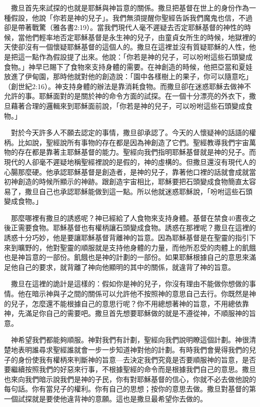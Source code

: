 \documentclass{book}
\begin{document}
　撒旦首先來試探的也就是耶穌與神旨意的關係。撒旦把基督在世上的身份作為一種假設，他說「你若是神的兒子」。我們無須提醒你聖經告訴我們魔鬼也信，不過卻是帶著戰驚（雅各書2:19）。當我們現代人毫不遲疑去否定耶穌基督的神性的時候，當他們輕率地否定耶穌基督是永生神的兒子，由童貞女所生的時候，地獄裡的天使卻沒有一個懷疑耶穌基督的這個人的。撒旦在這裡並沒有質疑耶穌的人性，他是把這一點作為假設提了出來。他說：「你若是神的兒子，可以吩咐這些石頭變成食物。」神早已賜下了食物來支持身體的需要。在神創造的時候，他把亞當和夏娃放進了伊甸園，那時他就對他的創造說：「園中各樣樹上的果子，你可以隨意吃」（創世紀2:16）。神支持身體的辦法是靠消耗食物。而撒旦卻在迷惑耶穌去做神不允許的事。耶穌面對的是關於神的命令方面的試探。在一個十分漂亮的外衣下，撒旦藉著合理的邏輯來到耶穌面前說，「你若是神的兒子，可以吩咐這些石頭變成食物。」

　對於今天許多人不願去認定的事情，撒旦卻承認了。今天的人懷疑神的話語的權柄。比如說，聖經說所有事物的存在都是因為神創造了它們。聖經教導我們宇宙萬物的存在都是靠著主耶穌基督的能力。聖經向我們指明耶穌基督就是神的兒子。而現代的人卻毫不遲疑地稱聖經裡說的是假的，神的虛構的。但撒旦還沒有現代人的心腸那麼硬。他承認耶穌基督是創造者，是神的兒子，靠著他口裡的話就會成就當初神創造的時候所顯示的神跡。跟創造宇宙相比，耶穌要把石頭變成食物簡直太容易了，撒旦自己也承認耶穌能做到這一點。所以他就迷惑耶穌說，「吩咐這些石頭變成食物。」

　那麼哪裡有撒旦的誘惑呢？神已經給了人食物來支持身體。基督在禁食40晝夜之後正需要食物。耶穌基督也有權柄讓石頭變成食物。誘惑在那裡呢？撒旦在這裡的誘惑十分巧妙，他是要讓耶穌基督背離神的旨意。因為耶穌基督是在聖靈的指引下來到曠野的，他對聖靈的順服就是支持他身體的力量，而他所忍受的肉體上的飢餓也是神旨意的一部份。飢餓也是神的計劃的一部份。如果耶穌根據自己的意思來滿足他自己的要求，就背離了神向他顯明的其中的關係，就違背了神的旨意。

　撒旦在這裡的詭計是這樣的：假如你是神的兒子，你沒有理由不能做你想做的事情。他在暗示神與子之間的關係可以允許他不按照神的意思自己去行。你既然是神的兒子，怎麼還不能根據自己的意思行呢？你不用總想著神的旨意，不用總依靠神，先滿足你自己的需要吧。撒旦首先想要耶穌做的就是不遵從神，不順服神的旨意。

　神希望我們都能夠順服。神對我們有計劃，聖經向我們說明瞭這個計劃。神很清楚地表明誰尋求聖經誰就會一步一步知道神對他的計劃。有時我們會覺得我們的兒子的身份使我有權柄來判斷神的旨意---去決定我們究竟是否要順服神的旨意，是否要繼續按照我們的好惡來行事，不根據聖經的命令而是根據我們自己的意思。撒旦也來向我們暗示說我們是神的子民，你有對耶穌基督的信心，你就不必去做他說的每句話。你有當兒子的權利。你有自己的思想；按你的意思去做。撒旦對基督的第一個試探就是要使他違背神的意願。這也是撒旦最希望你去做的。
\end{document}
